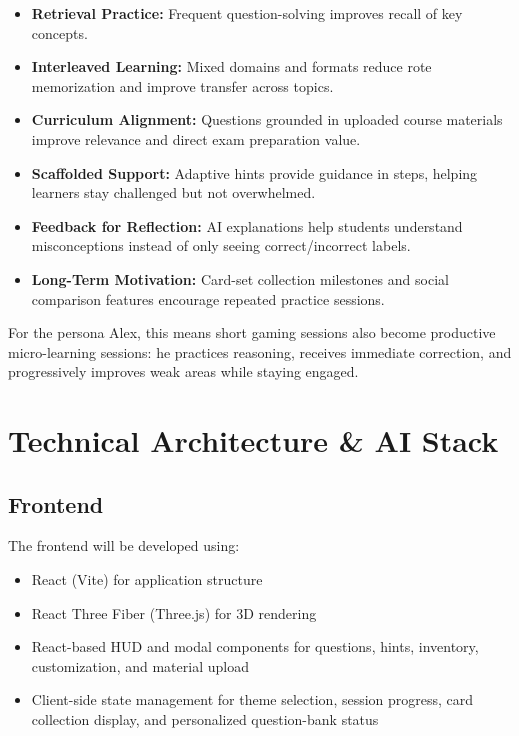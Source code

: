 \documentclass[12pt]{article}
\begin{document}
\begin{itemize}
    \item \textbf{Retrieval Practice:} Frequent question-solving improves recall of key concepts.
    \item \textbf{Interleaved Learning:} Mixed domains and formats reduce rote memorization and improve transfer across topics.
    \item \textbf{Curriculum Alignment:} Questions grounded in uploaded course materials improve relevance and direct exam preparation value.
    \item \textbf{Scaffolded Support:} Adaptive hints provide guidance in steps, helping learners stay challenged but not overwhelmed.
    \item \textbf{Feedback for Reflection:} AI explanations help students understand misconceptions instead of only seeing correct/incorrect labels.
    \item \textbf{Long-Term Motivation:} Card-set collection milestones and social comparison features encourage repeated practice sessions.
\end{itemize}

For the persona Alex, this means short gaming sessions also become productive micro-learning sessions: he practices reasoning, receives immediate correction, and progressively improves weak areas while staying engaged.

\section{Technical Architecture \& AI Stack}

\subsection{Frontend}

The frontend will be developed using:
\begin{itemize}
    \item React (Vite) for application structure
    \item React Three Fiber (Three.js) for 3D rendering
    \item React-based HUD and modal components for questions, hints, inventory, customization, and material upload
    \item Client-side state management for theme selection, session progress, card collection display, and personalized question-bank status
\end{itemize}
\end{document}
